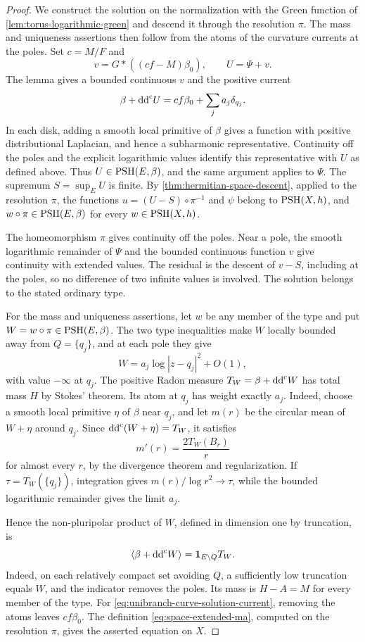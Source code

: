 \begin{proof}
We construct the solution on the normalization with the Green function of \cref{lem:torus-logarithmic-green} and descend it through the resolution $\pi$. The mass and uniqueness assertions then follow from the atoms of the curvature currents at the poles. Set $c=M/F$ and
\[
 v=G*((cf-M)\beta_0),\qquad U=\Psi+v.
\]
The lemma gives a bounded continuous $v$ and the positive current
\begin{equation}\label{eq:unibranch-curve-solution-current}
 \beta+\mathrm{dd}^{\mathrm{c}} U=cf\beta_0+\sum_j a_j\delta_{q_j}.
\end{equation}
In each disk, adding a smooth local primitive of $\beta$ gives a function with positive distributional Laplacian, and hence a subharmonic representative. Continuity off the poles and the explicit logarithmic values identify this representative with $U$ as defined above. Thus $U\in\mathrm{PSH}(E,\beta)$, and the same argument applies to $\Psi$. The supremum $S=\sup_EU$ is finite. By \cref{thm:hermitian-space-descent}, applied to the resolution $\pi$, the functions $u=(U-S)\circ\pi^{-1}$ and $\psi$ belong to $\mathrm{PSH}(X,h)$, and $w\circ\pi\in\mathrm{PSH}(E,\beta)$ for every $w\in\mathrm{PSH}(X,h)$.

The homeomorphism $\pi$ gives continuity off the poles. Near a pole, the smooth logarithmic remainder of $\Psi$ and the bounded continuous function $v$ give continuity with extended values. The residual is the descent of $v-S$, including at the poles, so no difference of two infinite values is involved. The solution belongs to the stated ordinary type.

For the mass and uniqueness assertions, let $w$ be any member of the type and put $W=w\circ\pi\in\mathrm{PSH}(E,\beta)$. The two type inequalities make $W$ locally bounded away from $Q=\{q_j\}$, and at each pole they give
\[
 W=a_j\log|z-q_j|^2+O(1),
\]
with value $-\infty$ at $q_j$. The positive Radon measure $T_W=\beta+\mathrm{dd}^{\mathrm{c}} W$ has total mass $H$ by Stokes' theorem. Its atom at $q_j$ has weight exactly $a_j$. Indeed, choose a smooth local primitive $\eta$ of $\beta$ near $q_j$, and let $m(r)$ be the circular mean of $W+\eta$ around $q_j$. Since $\mathrm{dd}^{\mathrm{c}}(W+\eta)=T_W$, it satisfies
\[
 m'(r)=\frac{2T_W(B_r)}r
\]
for almost every $r$, by the divergence theorem and regularization. If $\tau=T_W(\{q_j\})$, integration gives $m(r)/\log r^2\to\tau$, while the bounded logarithmic remainder gives the limit $a_j$.

Hence the non-pluripolar product of $W$, defined in dimension one by truncation, is
\[
 \langle\beta+\mathrm{dd}^{\mathrm{c}} W\rangle=\mathbf1_{E\setminus Q}T_W.
\]
Indeed, on each relatively compact set avoiding $Q$, a sufficiently low truncation equals $W$, and the indicator removes the poles. Its mass is $H-A=M$ for every member of the type. For \eqref{eq:unibranch-curve-solution-current}, removing the atoms leaves $cf\beta_0$. The definition \eqref{eq:space-extended-ma}, computed on the resolution $\pi$, gives the asserted equation on $X$.


\end{proof}
